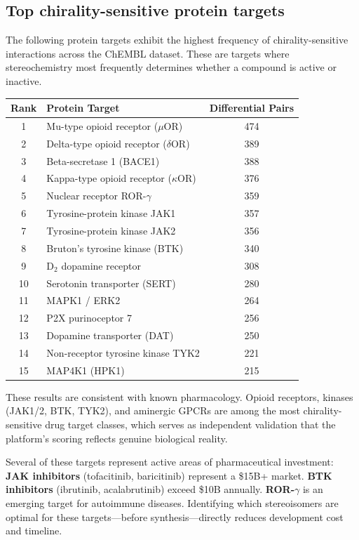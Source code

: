 \documentclass[11pt,a4paper]{article}
\begin{document}
\subsection{Top chirality-sensitive protein targets}

The following protein targets exhibit the highest frequency of chirality-sensitive
interactions across the ChEMBL dataset. These are targets where stereochemistry
most frequently determines whether a compound is active or inactive.

\begin{center}
\begin{tabular}{clc}
\toprule
\textbf{Rank} & \textbf{Protein Target} & \textbf{Differential Pairs} \\
\midrule
1 & Mu-type opioid receptor ($\mu$OR) & 474 \\
2 & Delta-type opioid receptor ($\delta$OR) & 389 \\
3 & Beta-secretase 1 (BACE1) & 388 \\
4 & Kappa-type opioid receptor ($\kappa$OR) & 376 \\
5 & Nuclear receptor ROR-$\gamma$ & 359 \\
6 & Tyrosine-protein kinase JAK1 & 357 \\
7 & Tyrosine-protein kinase JAK2 & 356 \\
8 & Bruton's tyrosine kinase (BTK) & 340 \\
9 & D$_2$ dopamine receptor & 308 \\
10 & Serotonin transporter (SERT) & 280 \\
11 & MAPK1 / ERK2 & 264 \\
12 & P2X purinoceptor 7 & 256 \\
13 & Dopamine transporter (DAT) & 250 \\
14 & Non-receptor tyrosine kinase TYK2 & 221 \\
15 & MAP4K1 (HPK1) & 215 \\
\bottomrule
\end{tabular}
\end{center}

These results are consistent with known pharmacology. Opioid receptors,
kinases (JAK1/2, BTK, TYK2), and aminergic GPCRs are among the most
chirality-sensitive drug target classes, which serves as independent
validation that the platform's scoring reflects genuine biological reality.

\begin{financialbox}
Several of these targets represent active areas of pharmaceutical investment:
\textbf{JAK inhibitors} (tofacitinib, baricitinib) represent a \$15B+ market.
\textbf{BTK inhibitors} (ibrutinib, acalabrutinib) exceed \$10B annually.
\textbf{ROR-$\gamma$} is an emerging target for autoimmune diseases.
Identifying which stereoisomers are optimal for these targets---before
synthesis---directly reduces development cost and timeline.
\end{financialbox}
\end{document}
